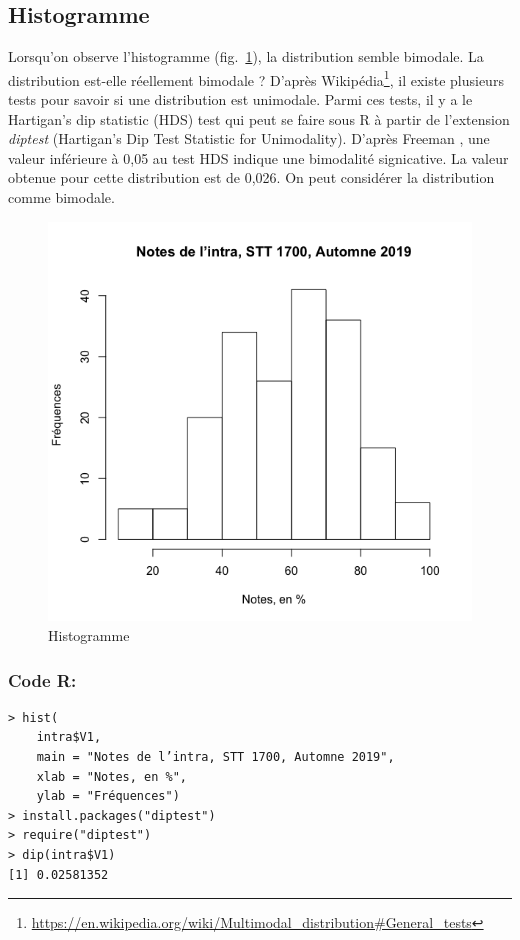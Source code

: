 \documentclass[10pt,twocolumn]{article}
\begin{document}
\subsection{Histogramme}
\label{histogramme}
Lorsqu’on observe l’histogramme (fig.~\ref{intraHist}), la distribution semble bimodale. La distribution est-elle réellement bimodale ? D’après Wikipédia\footnote{\url{https://en.wikipedia.org/wiki/Multimodal\_distribution\#General\_tests}}, il existe plusieurs tests pour savoir si une distribution est unimodale. Parmi ces tests, il y a le Hartigan’s dip statistic (HDS) test qui peut se faire sous R à partir de l’extension \textit{diptest} (Hartigan's Dip Test Statistic for Unimodality). D’après Freeman \cite{Freeman:2013aa}, une valeur inférieure à 0,05 au test HDS indique une bimodalité signicative. La valeur obtenue pour cette distribution est de 0,026. On peut considérer la distribution comme bimodale.


\begin{figure}[htbp]
	\caption{Histogramme}
	\label{intraHist}
	\centering
	\includegraphics[width=\linewidth]{d1_intraHist}
\end{figure}

\subsubsection*{Code R:}
\begin{verbatim}
> hist(
    intra$V1,
    main = "Notes de l’intra, STT 1700, Automne 2019",
    xlab = "Notes, en %",
    ylab = "Fréquences")
> install.packages("diptest")
> require("diptest")
> dip(intra$V1)
[1] 0.02581352
\end{verbatim}
\end{document}
